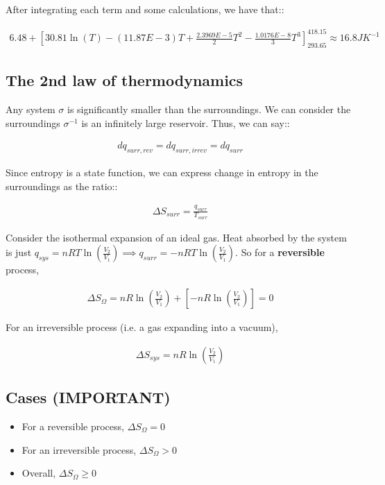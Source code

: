 \documentclass[12pt]{book}
\begin{document}
After integrating each term and some calculations, we have that::

\begin{align*}
    6.48+\left[30.81\ln(T)-(11.87E-3)T+\frac{2.3969E-5}{2}T^2-\frac{1.0176E-8}{3}T^3\right]_{293.65}^{418.15}\approx 16.8JK^{-1}
\end{align*}

\subsection*{The 2nd law of thermodynamics}

Any system $\sigma$ is significantly smaller than the surroundings. We can consider the surroundings $\sigma ^{-1}$ is an infinitely large reservoir. Thus, we can say::

\begin{align*}
    dq_{surr, rev}=dq_{surr, irrev}=dq_{surr}
\end{align*}

Since entropy is a state function, we can express change in entropy in the surroundings as the ratio::

\begin{align*}
    \Delta S_{surr}=\frac{q_{surr}}{T_{surr}}
\end{align*}

Consider the isothermal expansion of an ideal gas. Heat absorbed by the system is just $q_{sys}=nRT\ln\left(\frac{V_2}{V_1}\right)\implies q_{surr}=-nRT\ln\left(\frac{V_2}{V_1}\right)$. So for a \textbf{reversible} process, 

\begin{align*}
    \Delta S_{\Omega}=nR\ln\left(\frac{V_2}{V_1}\right)+\left[-nR\ln\left(\frac{V_2}{V_1}\right)\right]=0
\end{align*}

For an irreversible process (i.e. a gas expanding into a vacuum),

\begin{align*}
    \Delta S_{sys}=nR\ln\left(\frac{V_2}{V_1}\right)
\end{align*}

\subsection*{Cases (IMPORTANT)}

\begin{itemize}
    \item For a reversible process, $\Delta S_{\Omega}=0$
    \item For an irreversible process, $\Delta S_{\Omega}>0$
    \item Overall, $\Delta S_{\Omega}\geq 0$
\end{itemize}
\end{document}
